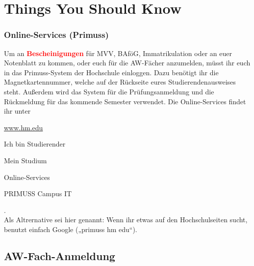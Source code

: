 \section{Things You Should Know}


\subsubsection{Online-Services (Primuss)}
\label{primuss}
Um an \textcolor{red}{\textbf{Bescheinigungen}} für MVV, BAföG, Immatrikulation oder an euer Notenblatt zu kommen, oder euch für die AW-Fächer anzumelden, müsst ihr euch in das Primuss-System der Hochschule einloggen. Dazu benötigt ihr die Magnetkartennummer, welche auf der Rückseite eures Studierendenausweises steht. Außerdem wird das System für die Prüfungsanmeldung und die Rückmeldung für das kommende Semester verwendet.\doublebreak
Die Online-Services findet ihr unter
\begin{sitenav}
	\item \url{www.hm.edu}
	\item Ich bin Studierender
	\item Mein Studium
	\item Online-Services
	\item PRIMUSS Campus IT
\end{sitenav}.\\
Als Altrernative sei hier genannt: Wenn ihr etwas auf den Hochschulseiten sucht, benutzt einfach Google („primuss hm edu“).

\subsection{AW-Fach-Anmeldung}

